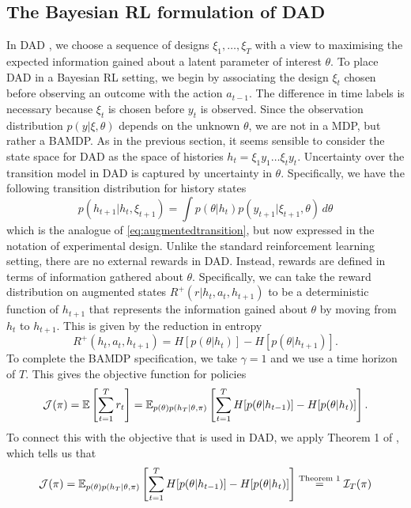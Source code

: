 \documentclass[a4paper, 10pt]{report}
\theoremstyle{plain}
\begin{document}
	\subsection{The Bayesian RL formulation of DAD}
	In DAD \citep{foster2021dad}, we choose a sequence of designs $\xi_1,\dots,\xi_T$ with a view to maximising the expected information gained about a latent parameter of interest $\theta$.
	To place DAD in a Bayesian RL setting, we begin by associating the design $\xi_t$ chosen before observing an outcome with the action $a_{t-1}$.
	The difference in time labels is necessary because $\xi_t$ is chosen before $y_t$ is observed.
	Since the observation distribution $p(y|\xi,\theta)$ depends on the unknown $\theta$, we are not in a MDP, but rather a BAMDP.
	As in the previous section, it seems sensible to consider the state space for DAD as the space of histories $h_t = \xi_1y_1\dots\xi_ty_t$.
	Uncertainty over the transition model in DAD is captured by uncertainty in $\theta$. Specifically, we have the following transition distribution for history states
	\begin{equation}
	p(h_{t+1}|h_t,\xi_{t+1}) = \int p(\theta|h_t)p(y_{t+1}|\xi_{t+1},\theta) \, d\theta
	\end{equation}
	which is the analogue of \eqref{eq:augmentedtransition}, but now expressed in the notation of experimental design.
	Unlike the standard reinforcement learning setting, there are no external rewards in DAD.
	Instead, rewards are defined in terms of information gathered about $\theta$.
	Specifically, we can take the reward distribution on augmented states $R^+(r|h_t,a_t,h_{t+1})$ to be a deterministic function of $h_{t+1}$ that represents the information gained about $\theta$ by moving from $h_t$ to $h_{t+1}$. This is given by the reduction in entropy
	\begin{equation}
	R^+(h_t,a_t,h_{t+1}) = H[p(\theta|h_{t})] - H[p(\theta|h_{t+1})].
	\end{equation}
	To complete the BAMDP specification, we take $\gamma=1$ and we use a time horizon of $T$.
	This gives the objective function for policies
	\begin{equation}
	\mathcal{J}(\pi) =  \mathbb{E}\left[\sum_{t=1}^T r_t \right] = \mathbb{E}_{p(\theta)p(h_T|\theta,\pi)}\left[\sum_{t=1}^T H[p(\theta|h_{t-1})] - H[p(\theta|h_t)] \right].
	\end{equation}
	To connect this with the objective that is used in DAD, we apply Theorem 1 of \citet{foster2021dad}, which tells us that 
	\begin{equation}
	\mathcal{J}(\pi) =\mathbb{E}_{p(\theta)p(h_T|\theta,\pi)}\left[\sum_{t=1}^T H[p(\theta|h_{t-1})] - H[p(\theta|h_t)] \right] \overset{\text{Theorem 1}}{=} \mathcal{I}_T(\pi)
	\end{equation}
\end{document}
